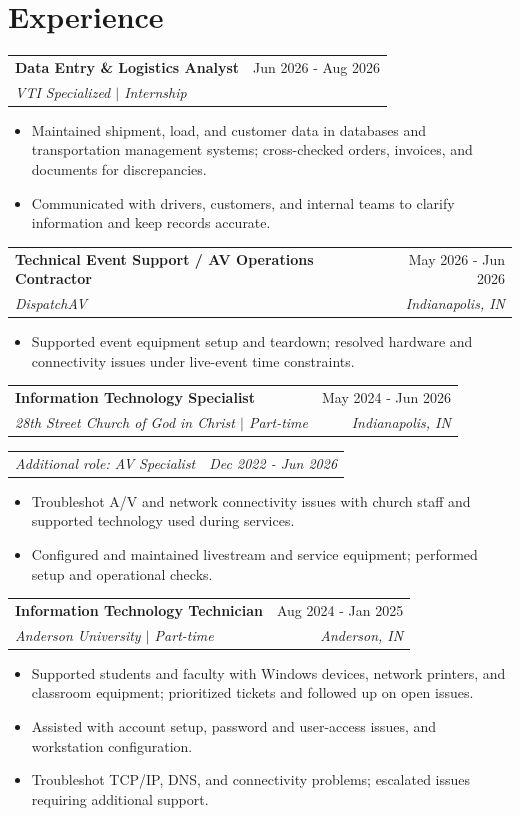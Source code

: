 \documentclass[10pt,letterpaper]{article}
\makeatletter
\newcommand{\role}[4]{%
  \begin{tabularx}{\textwidth}{@{}Xr@{}}
    \textbf{#1} & #2 \\
    \textit{#3} & \textit{#4}
  \end{tabularx}\vspace{-1pt}
}
\newcommand{\entrygap}{\vspace{3pt}}
\makeatother
\begin{document}
\section{Experience}
\role{Data Entry \& Logistics Analyst}{Jun 2026 - Aug 2026}{VTI Specialized $|$ Internship}{}
\begin{itemize}
  \item Maintained shipment, load, and customer data in databases and transportation management systems; cross-checked orders, invoices, and documents for discrepancies.
  \item Communicated with drivers, customers, and internal teams to clarify information and keep records accurate.
\end{itemize}
\entrygap
\role{Technical Event Support / AV Operations Contractor}{May 2026 - Jun 2026}{DispatchAV}{Indianapolis, IN}
\begin{itemize}
  \item Supported event equipment setup and teardown; resolved hardware and connectivity issues under live-event time constraints.
\end{itemize}
\entrygap
\role{Information Technology Specialist}{May 2024 - Jun 2026}{28th Street Church of God in Christ $|$ Part-time}{Indianapolis, IN}
\begin{tabularx}{\textwidth}{@{}Xr@{}}
  \textit{Additional role: AV Specialist} & \textit{Dec 2022 - Jun 2026}
\end{tabularx}\vspace{-1pt}
\begin{itemize}
  \item Troubleshot A/V and network connectivity issues with church staff and supported technology used during services.
  \item Configured and maintained livestream and service equipment; performed setup and operational checks.
\end{itemize}
\entrygap
\role{Information Technology Technician}{Aug 2024 - Jan 2025}{Anderson University $|$ Part-time}{Anderson, IN}
\begin{itemize}
  \item Supported students and faculty with Windows devices, network printers, and classroom equipment; prioritized tickets and followed up on open issues.
  \item Assisted with account setup, password and user-access issues, and workstation configuration.
  \item Troubleshot TCP/IP, DNS, and connectivity problems; escalated issues requiring additional support.
\end{itemize}
\end{document}
